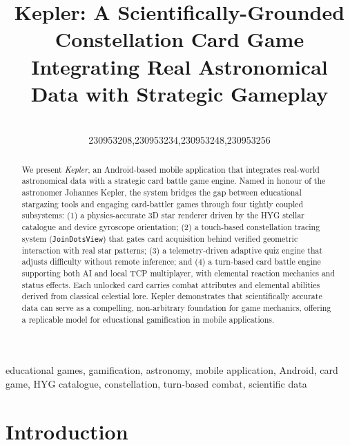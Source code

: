 \documentclass[conference]{IEEEtran}
\begin{document}
\title{Kepler: A Scientifically-Grounded Constellation Card Game\\
Integrating Real Astronomical Data with Strategic Gameplay}

\author{
   \\
  {230953208,230953234,230953248,230953256}
}

\maketitle

\begin{abstract}
We present \textit{Kepler}, an Android-based mobile application that integrates real-world astronomical data with a strategic card battle game engine. Named in honour of the astronomer Johannes Kepler, the system bridges the gap between educational stargazing tools and engaging card-battler games through four tightly coupled subsystems: (1) a physics-accurate 3D star renderer driven by the HYG stellar catalogue and device gyroscope orientation; (2) a touch-based constellation tracing system (\texttt{JoinDotsView}) that gates card acquisition behind verified geometric interaction with real star patterns; (3) a telemetry-driven adaptive quiz engine that adjusts difficulty without remote inference; and (4) a turn-based card battle engine supporting both AI and local TCP multiplayer, with elemental reaction mechanics and status effects. Each unlocked card carries combat attributes and elemental abilities derived from classical celestial lore. Kepler demonstrates that scientifically accurate data can serve as a compelling, non-arbitrary foundation for game mechanics, offering a replicable model for educational gamification in mobile applications.
\end{abstract}

\begin{IEEEkeywords}
educational games, gamification, astronomy, mobile application, Android, card game, HYG catalogue, constellation, turn-based combat, scientific data
\end{IEEEkeywords}

\section{Introduction}
\end{document}
